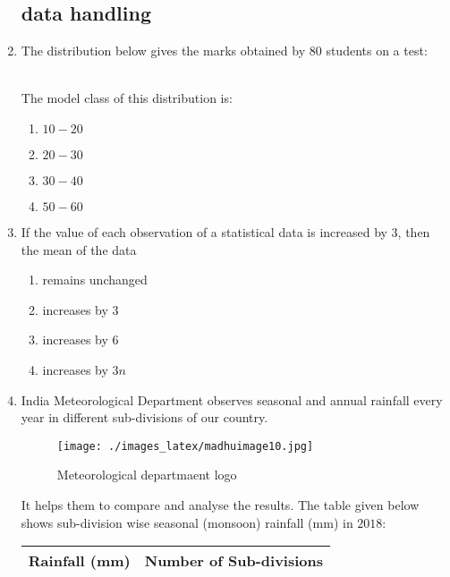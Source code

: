\documentclass{article}
\begin{document}
\begin{enumerate}
\subsection{data handling}
\item  The distribution below gives the marks obtained by 80 students on a test:
\begin{table}[htb]
\centering
{}
\end{table}\\
The model class of this distribution is:
\begin{enumerate}
\item $10 - 20$
\item $20 - 30$ 
\item $30 - 40$
\item $50 - 60$
\end{enumerate}
\item If the value of each observation of a statistical data is increased by $3$, then the mean of the data  
\begin{enumerate}
\item remains unchanged  
\item increases by $3$  
\item increases by $6$
\item increases by $3n$
\end{enumerate}
\item India Meteorological Department observes seasonal and annual rainfall every year in different sub-divisions of our country.
\begin{figure}[H]  
\centering
\texttt{[image: ./images\_latex/madhuimage10.jpg]}
\label{fig:fig10}
\caption{Meteorological departmaent logo} 
\end{figure}
It helps them to compare and analyse the results. The table given below shows sub-division wise seasonal (monsoon) rainfall (mm) in $2018$:
\begin{center}
\begin{tabular}{|c|c|}
\hline
\textbf{Rainfall (mm)} & \textbf{Number of Sub-divisions} \\ \hline

\end{tabular}
\end{center}
\end{enumerate}
\end{document}
